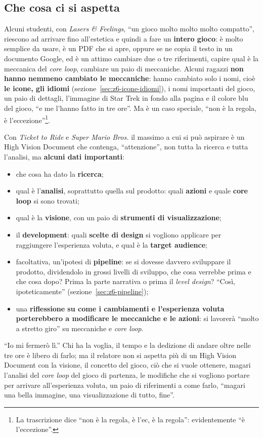 \subsection{Che cosa ci si aspetta}

Alcuni studenti, con \emph{Lasers \& Feelings}, ``un gioco molto molto molto
compatto'', riescono ad arrivare fino all'estetica e quindi a fare un
\textbf{intero gioco}: è molto semplice da usare, è un PDF che si apre, oppure
se ne copia il testo in un documento Google, ed è un attimo cambiare due o tre
riferimenti, capire qual è la meccanica del \emph{core loop}, cambiare un paio
di meccaniche. Alcuni ragazzi \textbf{non hanno nemmeno cambiato le meccaniche}:
hanno cambiato solo i nomi, cioè \textbf{le icone, gli idiomi}
(sezione~\ref{sec:z6-icone-idiomi}), i nomi importanti del gioco, un paio di
dettagli, l'immagine di Star Trek in fondo alla pagina e il colore blu del
gioco, ``e me l'hanno fatto in tre ore''. Ma è un caso speciale, ``non è la
regola, è l'eccezione''\footnote{La trascrizione dice ``non è la regola, è
l'ec, è la regola'': evidentemente ``è l'eccezione''.}.

Con \emph{Ticket to Ride} e \emph{Super Mario Bros.} il massimo a cui si può
aspirare è un High Vision Document che contenga, ``attenzione'', non tutta la
ricerca e tutta l'analisi, ma \textbf{alcuni dati importanti}:
\begin{itemize}
  \item che cosa ha dato la \textbf{ricerca};
  \item qual è l'\textbf{analisi}, soprattutto quella sul prodotto: quali
        \textbf{azioni} e quale \textbf{core loop} si sono trovati;
  \item qual è la \textbf{visione}, con un paio di \textbf{strumenti di
        visualizzazione};
  \item il \textbf{development}: quali \textbf{scelte di design} si vogliono
        applicare per raggiungere l'esperienza voluta, e qual è la
        \textbf{target audience};
  \item facoltativa, un'ipotesi di \textbf{pipeline}: se si dovesse davvero
        sviluppare il prodotto, dividendolo in grossi livelli di sviluppo, che
        cosa verrebbe prima e che cosa dopo? Prima la parte narrativa o prima il
        \emph{level design}? ``Così, ipoteticamente''
        (sezione~\ref{sec:z6-pipeline});
  \item una \textbf{riflessione su come i cambiamenti e l'esperienza voluta
        porterebbero a modificare le meccaniche e le azioni}: si lavorerà ``molto
        a stretto giro'' su meccaniche e \emph{core loop}.
\end{itemize}
``Io mi fermerò lì.'' Chi ha la voglia, il tempo e la dedizione di andare oltre
nelle tre ore è libero di farlo; ma il relatore non si aspetta più di un High
Vision Document con la visione, il concetto del gioco, ciò che si vuole
ottenere, magari l'analisi del \emph{core loop} del gioco di partenza, le
modifiche che si vogliono portare per arrivare all'esperienza voluta, un paio di
riferimenti a come farlo, ``magari una bella immagine, una visualizzazione di
tutto, fine''.


